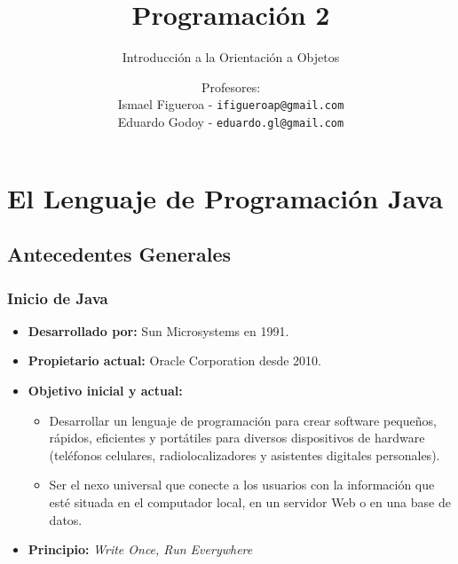 \documentclass{beamer}
\title[\textbf{Programación 2}]{\textbf{Programación 2}}
\subtitle{Introducción a la Orientación a Objetos}
\author[IF-EG]
{
  Profesores:\\
  Ismael Figueroa -  \texttt{\small ifigueroap@gmail.com}\\
  \vspace{0.5mm}
  Eduardo Godoy - \texttt{\small eduardo.gl@gmail.com}
}
\institute[Universidad de Valparaíso]
\date{}
\begin{document}
\begin{frame}
  \titlepage
\end{frame}

\section{El Lenguaje de Programación Java}

\subsection{Antecedentes Generales}

\begin{frame}
  \frametitle{Inicio de Java}

    \begin{itemize}
    \item \textbf{Desarrollado por:} Sun Microsystems en 1991.
    \item \textbf{Propietario actual:} Oracle Corporation desde 2010.
    \item \textbf{Objetivo inicial y actual:}
      
      \begin{itemize}
      \item Desarrollar un lenguaje de programación para crear
        software peque\~nos, rápidos, eficientes y portátiles para
        diversos dispositivos de hardware (teléfonos celulares,
        radiolocalizadores y asistentes digitales personales).
        
      \item Ser el nexo universal que conecte a los usuarios con la
        información que esté situada en el computador local, en un
        servidor Web o en una base de datos.
      \end{itemize}
      
    \item \textbf{Principio:} \emph{Write Once, Run Everywhere}
      
    \end{itemize}    

\end{frame}
\end{document}
